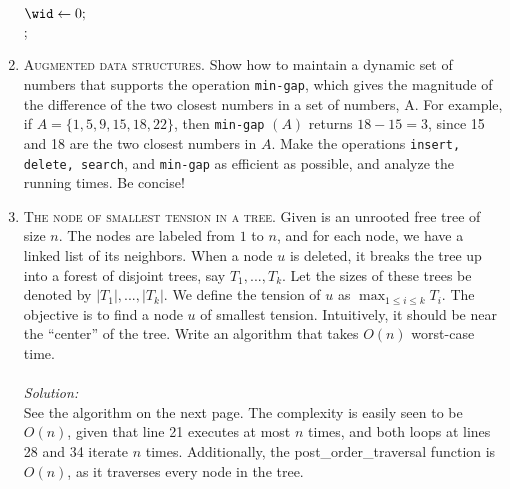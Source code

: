 \documentclass[12pt]{article}
\theoremstyle{definition}
\theoremstyle{remark}
\newcommand\sol{%
  \\ 
  \\
  \textit{Solution:}\\%
}
\begin{document}
\begin{enumerate}
\begin{algorithm}
    $\wid \gets 0;$\\ 
    \Return \wid;
    
  \end{algorithm}
 \newpage 
  \item \textsc{Augmented data structures.} Show how to maintain a dynamic set of numbers that
supports the operation \texttt{min-gap}, which gives the magnitude of the difference of the two closest numbers in a set of numbers, A. For example, if $A = \{1, 5, 9, 15, 18, 22\}$, then \texttt{min-gap} $(A)$ returns $18 - 15 = 3$, since 15 and 18 are the two closest numbers in $A$. Make the operations \texttt{insert, delete, search}, and \texttt{min-gap} as efficient as possible, and analyze the running times. Be concise! 
\newpage 
\item \textsc{The node of smallest tension in a tree.} Given is an unrooted free tree of size $n$.
The nodes are labeled from $1$ to $n$, and for each node, we have a linked list of its neighbors. When a node $u$ is deleted, it breaks the tree up into a forest of disjoint trees, say $T_1, ... , T_k$. Let the sizes of these trees be denoted by $|T_1|,... , |T_k|$. We define the tension of $u$ as $\max_{1 \leq i \leq k} T_i$. The objective is to find a node $u$ of smallest tension. Intuitively, it should be near the “center” of the tree. Write an algorithm
that takes $O(n)$ worst-case time.
\sol 
See the algorithm on the next page. The complexity is easily seen to be $O(n)$, given that line 21 executes at most $n$ times, and both loops at lines 28 and 34 iterate $n$ times. Additionally, the post\_order\_traversal function is $O(n)$, as it traverses every node in the tree. 


\end{enumerate}
\end{document}
